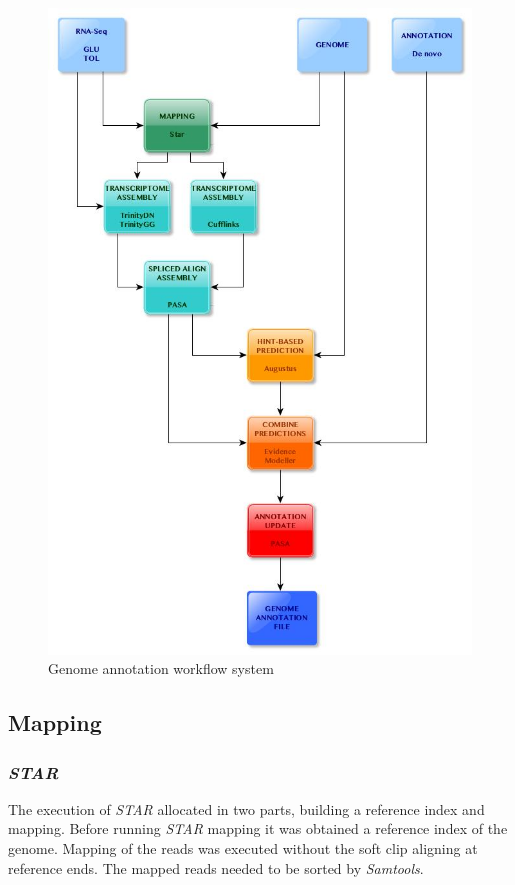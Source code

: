 \documentclass[12pt, a4paper]{report}
\begin{document}
\begin{figure}[H]
	\centering	
	\includegraphics[width=360pt]{pics/pipeline}
	\caption[Genome Annotation Workflow]
	{Genome annotation workflow system}
	\label{fig:pipeline}
\end{figure}

\subsection*{Mapping}
\subsubsection*{\textit{STAR}}
The execution of \textit{STAR} allocated in two parts, building a reference index and mapping. Before running \textit{STAR} mapping it was obtained a reference index of the genome. Mapping of the reads was executed without the soft clip aligning at reference ends. The mapped reads needed to be sorted by \textit{Samtools}.
\end{document}

